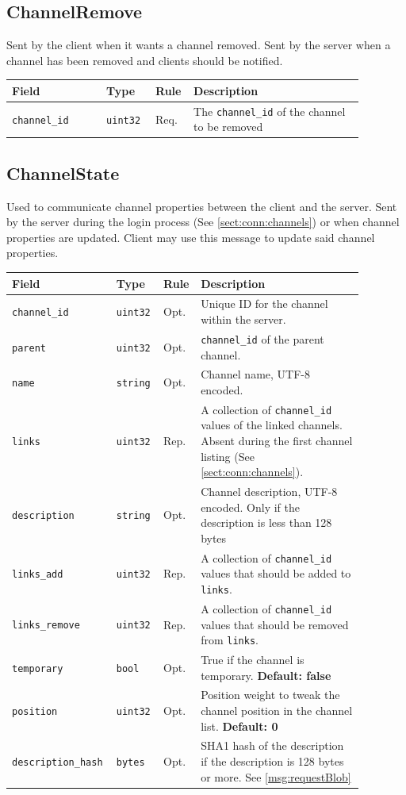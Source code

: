 \documentclass[11pt]{article} %
\newenvironment{mumbleMessageEx}
{%
	\small
	\renewcommand\arraystretch{1.5}
	\begin{tabular}{p{0.25\linewidth}p{0.13\linewidth}p{0.05\linewidth}p{0.45\linewidth}}
	Field & Type & Rule & Description \\
	\hline
}
{%
	\end{tabular}
	\renewcommand\arraystretch{1.0}
}
\newcommand{\mumbleMessageExItem}[4]{ \texttt{#1} & \texttt{#2} & #3 & #4 \\ }
\begin{document}
\subsection{ChannelRemove}
\label{msg:channelRemove}

Sent by the client when it wants a channel removed. Sent by the server when a channel has been removed and clients should be notified.

\begin{mumbleMessageEx}
\mumbleMessageExItem{channel\_id}{uint32}{Req.}{The \texttt{channel\_id} of the channel to be removed}
\end{mumbleMessageEx}

\subsection{ChannelState}
\label{msg:channelState}

Used to communicate channel properties between the client and the server. Sent by the server during the login process (See \ref{sect:conn:channels}) or when channel properties are updated. Client may use this message to update said channel properties.

\begin{mumbleMessageEx}
\mumbleMessageExItem{channel\_id}{uint32}{Opt.}{Unique ID for the channel within the server.}
\mumbleMessageExItem{parent}{uint32}{Opt.}{\texttt{channel\_id} of the parent channel.}
\mumbleMessageExItem{name}{string}{Opt.}{Channel name, UTF-8 encoded.}
\mumbleMessageExItem{links}{uint32}{Rep.}{A collection of \texttt{channel\_id} values of the linked channels. Absent during the first channel listing (See \ref{sect:conn:channels}).}
\mumbleMessageExItem{description}{string}{Opt.}{Channel description, UTF-8 encoded. Only if the description is less than 128 bytes}
\mumbleMessageExItem{links\_add}{uint32}{Rep.}{A collection of \texttt{channel\_id} values that should be added to \texttt{links}.}
\mumbleMessageExItem{links\_remove}{uint32}{Rep.}{A collection of \texttt{channel\_id} values that should be removed from \texttt{links}.}
\mumbleMessageExItem{temporary}{bool}{Opt.}{True if the channel is temporary. \textbf{Default: false}}
\mumbleMessageExItem{position}{uint32}{Opt.}{Position weight to tweak the channel position in the channel list. \textbf{Default: 0}}
\mumbleMessageExItem{description\_hash}{bytes}{Opt.}{SHA1 hash of the description if the description is 128 bytes or more. See \ref{msg:requestBlob}}
\end{mumbleMessageEx}
\end{document}
